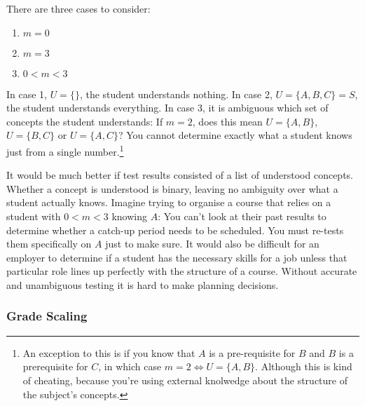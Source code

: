         There are three cases to consider:

        \begin{enumerate}
          \item \(m = 0\)
          \item \(m = 3\)
          \item \(0 < m < 3\)
        \end{enumerate}

        In case 1, \(U = \{\}\), the student understands nothing. In case 2, \(U = \{A, B, C\} = S\), the student understands everything. In case 3, it is ambiguous which set of concepts the student understands: If \(m = 2\), does this mean \(U = \{A, B\}\), \(U = \{B, C\}\) or \(U = \{A, C\}\)? You cannot determine exactly what a student knows just from a single number.\footnote{An exception to this is if you know that \(A\) is a pre-requisite for \(B\) and \(B\) is a prerequisite for \(C\), in which case \(m = 2 \iff U = \{A, B\}\). Although this is kind of cheating, because you're using external knolwedge about the structure of the subject's concepts.}

        It would be much better if test results consisted of a list of understood concepts. Whether a concept is understood is binary, leaving no ambiguity over what a student actually knows. Imagine trying to organise a course that relies on a student with \(0 < m < 3\) knowing \(A\): You can't look at their past results to determine whether a catch-up period needs to be scheduled. You must re-tests them specifically on \(A\) just to make sure. It would also be difficult for an employer to determine if a student has the necessary skills for a job unless that particular role lines up perfectly with the structure of a course. Without accurate and unambiguous testing it is hard to make planning decisions.

      \subsubsection{Grade Scaling}

